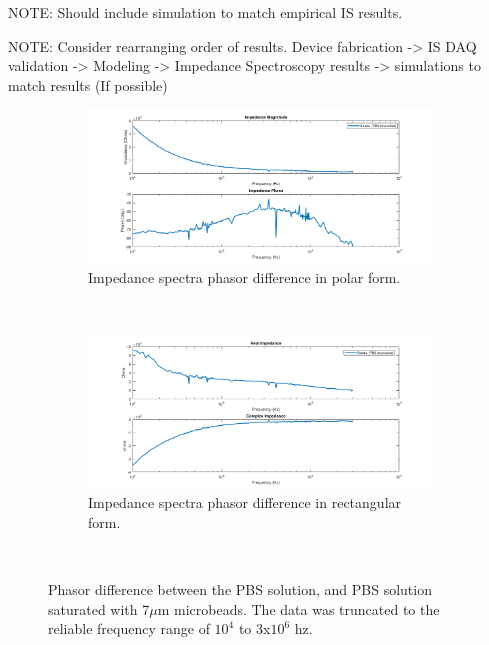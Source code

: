 \par NOTE: Should include simulation to match empirical IS results.

\par NOTE: Consider rearranging order of results. Device fabrication -> IS DAQ validation -> Modeling -> Impedance Spectroscopy results -> simulations to match results (If possible)

\begin{figure}[h]
    \centering
    \begin{subfigure}[b]{\textwidth}
        \centering
        \includegraphics[width=\textwidth]{images/IS_data_beads-PBS_truncated_mag_phase.png}
        \caption{Impedance spectra phasor difference in polar form.}
    \end{subfigure}
    \\
    \vspace{0.1 in}
    \begin{subfigure}[b]{\textwidth}
        \centering
        \includegraphics[width=\textwidth]{images/IS_data_beads-PBS_truncated_real_imag.png}
        \caption{Impedance spectra phasor difference in rectangular form.}
    \end{subfigure}
    \\
    \caption[Truncated phasor difference between PBS, and micro-bead saturated PBS.]{Phasor difference between the PBS solution, and PBS solution saturated with 7$\mu$m microbeads. The data was truncated to the reliable frequency range of $10^4$ to $3$x$10^6$ hz.}
    \label{fig:IS_data_beads_pbs_DI_comp}
\end{figure}



